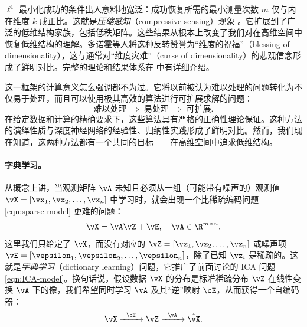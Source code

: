 \documentclass[../../book-main_zh.tex]{subfiles}
\begin{document}
\(\ell^{1}\) 最小化成功的条件出人意料地宽泛：成功恢复所需的最小测量次数 \(m\) 仅与内在维度 \(k\)
成正比。这就是\textit{压缩感知}（compressive sensing）现象
\cite{CandesE2006-ICM}。它扩展到了广泛的低维结构家族，包括低秩矩阵。这些结果从根本上改变了我们对在高维空间中恢复低维结构的理解。多诺霍等人将这种反转赞誉为“维度的祝福”（blessing of
dimensionality）\cite{DonohoD2000}，这与通常对“维度灾难”（curse of
dimensionality）的悲观信念形成了鲜明对比。完整的理论和结果体系在 \cite{Wright-Ma-2022} 中有详细介绍。

这一框架的计算意义怎么强调都不为过。它将以前被认为难以处理的问题转化为不仅易于处理，而且可以使用极其高效的算法进行可扩展求解的问题：
\begin{equation}
    \text{难以处理} \;\Longrightarrow\; \text{易处理}
    \;\Longrightarrow\; \text{可扩展}.
\end{equation}
在给定数据和计算的精确要求下，这些算法具有严格的正确性理论保证。这种方法的演绎性质与深度神经网络的经验性、归纳性实践形成了鲜明对比。然而，我们现在知道，这两种方法都有一个共同的目标——在高维空间中追求低维结构。

\paragraph{字典学习。}
从概念上讲，当观测矩阵 \(\vA\) 未知且必须从一组（可能带有噪声的）观测值 \(\vX = [\vx_{1}, \vx_{2},
\ldots, \vx_{n}]\) 中学习时，就会出现一个比稀疏编码问题 \eqref{eqn:sparse-model} 更难的问题：
\begin{equation}
    \vX = \vA \vZ + \vE, \quad \vA \in \R^{m\times n}.
    \label{eqn:dictionary-learning}
\end{equation}
这里我们只给定了 \(\vX\)，而没有对应的 \(\vZ = [\vz_{1}, \vz_{2}, \ldots, \vz_{n}]\)
或噪声项 \(\vE = [\vepsilon_{1}, \vepsilon_{2}, \ldots,
\vepsilon_{n}]\)，除了已知 \(\vz_{i}\) 是稀疏的。这就是\textit{字典学习}（dictionary
learning）问题，它推广了前面讨论的 ICA 问题 \eqref{eqn:ICA-model}。换句话说，假设数据 \(\vX\)
的分布是标准稀疏分布 \(\vZ\) 在线性变换 \(\vA\) 下的像，我们希望同时学习 \(\vA\) 及其“逆”映射
\(\cE\)，从而获得一个自编码器：
\begin{equation}
    \vX   \xrightarrow{\hspace{2mm} \cE\hspace{2mm}}  \vZ
    \xrightarrow{\hspace{2mm} \vA \hspace{2mm}} \hat{\vX}.
    \label{eqn:decoding-DL}
\end{equation}
\end{document}

